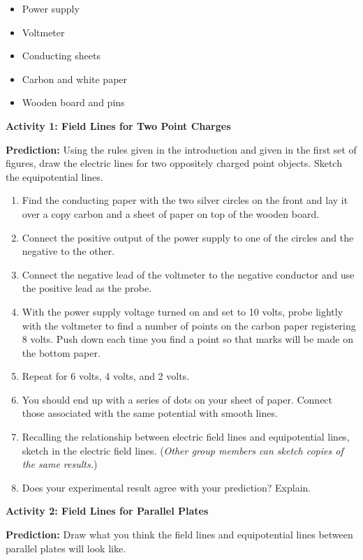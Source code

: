 \begin{itemize}
\item Power supply
\item Voltmeter
\item Conducting sheets
\item Carbon and white paper
\item Wooden board and pins
\end{itemize}
\textbf{Activity 1: Field Lines for Two Point Charges}

\textbf{Prediction:} Using the rules given in the introduction and
given in the first set of figures, draw the electric lines for two
oppositely charged point objects. Sketch the equipotential lines.
\vspace{1in}

\begin{enumerate}
\item Find the conducting paper with the two silver circles on the front
and lay it over a copy carbon and a sheet of paper on top of the wooden
board.
\item Connect the positive output of the power supply to one of the circles
and the negative to the other.
\item Connect the negative lead of the voltmeter to the negative conductor
and use the positive lead as the probe. 
\item With the power supply voltage turned on and set to 10 volts, probe
lightly with the voltmeter to find a number of points on the carbon
paper registering 8 volts. Push down each time you find a point so
that marks will be made on the bottom paper.
\item Repeat for 6 volts, 4 volts, and 2 volts.
\item You should end up with a series of dots on your sheet of paper. Connect
those associated with the same potential with smooth lines.
\item Recalling the relationship between electric field lines and equipotential
lines, sketch in the electric field lines. (\emph{Other group members
can sketch copies of the same results.})
\item Does your experimental result agree with your prediction? Explain.\vspace{15mm}

\end{enumerate}
\textbf{Activity 2: Field Lines for Parallel Plates}

\textbf{Prediction:} Draw what you think the field lines and equipotential
lines between parallel plates will look like.
\vspace{1in}


